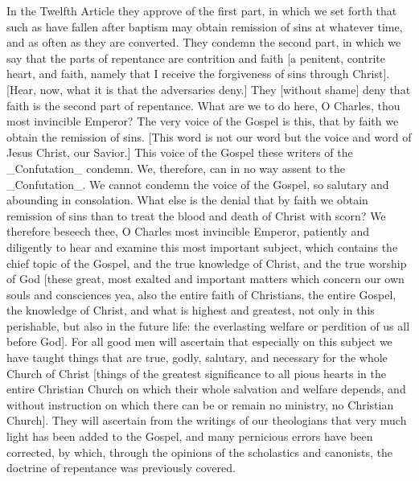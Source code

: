 In the Twelfth Article they approve of the first part, in which we
set forth that such as have fallen after baptism may obtain remission
of sins at whatever time, and as often as they are converted.  They
condemn the second part, in which we say that the parts of repentance
are contrition and faith [a penitent, contrite heart, and faith,
namely that I receive the forgiveness of sins through Christ].  [Hear,
now, what it is that the adversaries deny.] They [without shame]
deny that faith is the second part of repentance.  What are we to do
here, O Charles, thou most invincible Emperor?  The very voice of the
Gospel is this, that by faith we obtain the remission of sins.  [This
word is not our word but the voice and word of Jesus Christ, our
Savior.] This voice of the Gospel these writers of the _Confutation_
condemn.  We, therefore, can in no way assent to the _Confutation_.
We cannot condemn the voice of the Gospel, so salutary and abounding
in consolation.  What else is the denial that by faith we obtain
remission of sins than to treat the blood and death of Christ with
scorn?  We therefore beseech thee, O Charles most invincible Emperor,
patiently and diligently to hear and examine this most important
subject, which contains the chief topic of the Gospel, and the true
knowledge of Christ, and the true worship of God [these great, most
exalted and important matters which concern our own souls and
consciences yea, also the entire faith of Christians, the entire
Gospel, the knowledge of Christ, and what is highest and greatest,
not only in this perishable, but also in the future life: the
everlasting welfare or perdition of us all before God].  For all good
men will ascertain that especially on this subject we have taught
things that are true, godly, salutary, and necessary for the whole
Church of Christ [things of the greatest significance to all pious
hearts in the entire Christian Church on which their whole salvation
and welfare depends, and without instruction on which there can be or
remain no ministry, no Christian Church].  They will ascertain from
the writings of our theologians that very much light has been added
to the Gospel, and many pernicious errors have been corrected, by
which, through the opinions of the scholastics and canonists, the
doctrine of repentance was previously covered.


